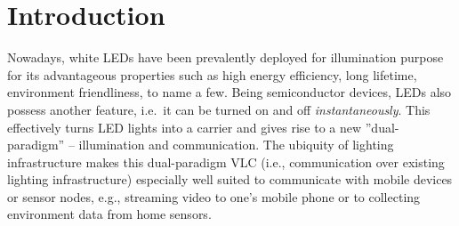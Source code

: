 \section{Introduction}






Nowadays, white LEDs have been prevalently deployed for illumination purpose for its advantageous properties such as high energy efficiency, long lifetime, environment friendliness, to name a few. Being semiconductor devices, LEDs also possess another feature, i.e.\, it can be turned on and off \textit{instantaneously}. This effectively turns LED lights into a carrier and gives rise to a new ''dual-paradigm'' -- illumination and communication. 
The ubiquity of lighting infrastructure makes this dual-paradigm VLC (i.e., communication over existing lighting infrastructure) especially well suited to communicate with mobile devices or sensor nodes, e.g., streaming video to one's mobile phone or to collecting environment data from home sensors. 

